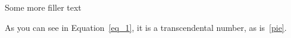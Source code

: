 

\usepackage{lipsum}



\begin{cheat}

\lipsum[1-1]
Some more filler text
\lipsum[2-2]

\maths[pie]{\Huge\pi}


As you can see in Equation~\ref{eq_1}, it is a transcendental number, as is~\ref{pie}.
\lipsum[3-100]
\end{cheat}



